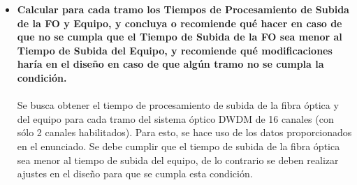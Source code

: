 \begin{itemize}
\item \textbf{Calcular para cada tramo los Tiempos de Procesamiento de Subida de la FO y Equipo, y concluya o recomiende qué hacer en caso de que no se cumpla que el Tiempo de Subida de la FO sea menor al Tiempo de Subida del Equipo, y recomiende qué modificaciones haría en el diseño en caso de que algún tramo no se cumpla la condición.}\\\\
Se busca obtener el tiempo de procesamiento de subida de la fibra óptica y del equipo para cada tramo del sistema óptico DWDM de 16 canales (con sólo 2 canales habilitados). Para esto, se hace uso de los datos proporcionados en el enunciado. Se debe cumplir que el tiempo de subida de la fibra óptica sea menor al tiempo de subida del equipo, de lo contrario se deben realizar ajustes en el diseño para que se cumpla esta condición.


\end{itemize}
